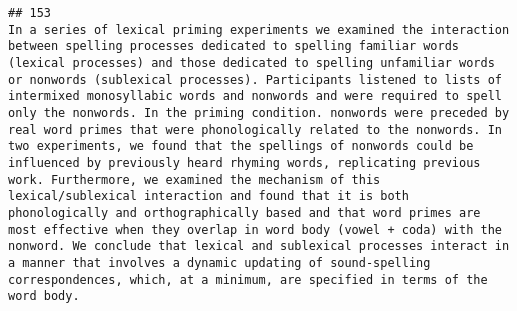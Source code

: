 \documentclass[
  english,
  man]{apa6}
\begin{document}
\begin{verbatim}
## 153                                                                                                                                                                                                                                                                                                                                                                                                                                                                                                                                                                                                                                                                                                                                                                                                                                                                                                                                                                                                                                                                                                                                                                                                                                                                                                                                                                                                                                                                                                                                                       In a series of lexical priming experiments we examined the interaction between spelling processes dedicated to spelling familiar words (lexical processes) and those dedicated to spelling unfamiliar words or nonwords (sublexical processes). Participants listened to lists of intermixed monosyllabic words and nonwords and were required to spell only the nonwords. In the priming condition. nonwords were preceded by real word primes that were phonologically related to the nonwords. In two experiments, we found that the spellings of nonwords could be influenced by previously heard rhyming words, replicating previous work. Furthermore, we examined the mechanism of this lexical/sublexical interaction and found that it is both phonologically and orthographically based and that word primes are most effective when they overlap in word body (vowel + coda) with the nonword. We conclude that lexical and sublexical processes interact in a manner that involves a dynamic updating of sound-spelling correspondences, which, at a minimum, are specified in terms of the word body.

\end{verbatim}
\end{document}
